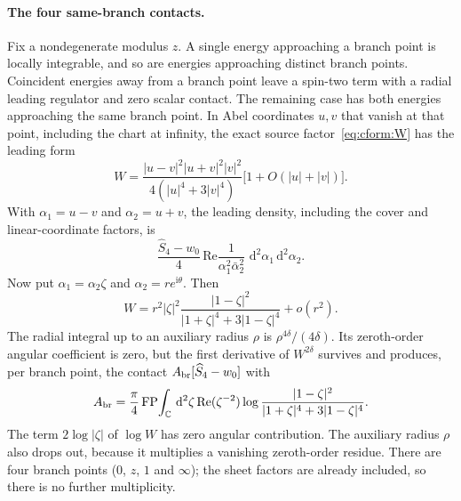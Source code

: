\documentclass[11pt,a4paper]{article}
\numberwithin{equation}{section}
\newcommand{\dd}{\,\mathrm d}
\newcommand{\FP}{\operatorname{FP}}
\begin{document}
\paragraph{The four same-branch contacts.} Fix a nondegenerate modulus $z$. A single energy approaching a branch point
is locally integrable, and so are energies approaching distinct branch points. Coincident energies away from a branch
point leave a spin-two term with a radial leading regulator and zero scalar contact. The remaining case has both
energies approaching the same branch point. In Abel coordinates $u,v$ that vanish at that point, including the chart
at infinity, the exact source factor~\eqref{eq:cform:W} has the leading form
\begin{equation}
 W=\frac{|u-v|^2|u+v|^2|v|^2}{4(|u|^4+3|v|^4)}\bigl[1+O(|u|+|v|)\bigr].
 \label{eq:cform:branchW}
\end{equation}
With $\alpha_1=u-v$ and $\alpha_2=u+v$, the leading density, including the cover and linear-coordinate factors, is
\begin{equation}
 \frac{\widehat S_4-w_0}{4}\,\mathrm{Re}\frac1{\alpha_1^2\bar\alpha_2^2}\,\dd^2\alpha_1\dd^2\alpha_2.
\end{equation}
Now put $\alpha_1=\alpha_2\zeta$ and $\alpha_2=re^{\mathrm i\theta}$. Then
\begin{equation}
 W=r^2|\zeta|^2\frac{|1-\zeta|^2}{|1+\zeta|^4+3|1-\zeta|^4}+o(r^2).
\end{equation}
The radial integral up to an auxiliary radius $\rho$ is $\rho^{4\delta}/(4\delta)$. Its zeroth-order angular
coefficient is zero, but the first derivative of $W^{2\delta}$ survives and produces, per branch point, the contact
$A_{\rm br}[\widehat S_4-w_0]$ with
\begin{equation}
 A_{\rm br}=\frac\pi4\FP\!\int_{\mathbb C}\dd^2\zeta\,\mathrm{Re}(\zeta^{-2})
 \log\frac{|1-\zeta|^2}{|1+\zeta|^4+3|1-\zeta|^4}.
 \label{eq:cform:Abr}
\end{equation}
The term $2\log|\zeta|$ of $\log W$ has zero angular contribution. The auxiliary radius $\rho$ also drops out,
because it multiplies a vanishing zeroth-order residue. There are four branch points ($0$, $z$, $1$ and $\infty$); the
sheet factors are already included, so there is no further multiplicity.
\end{document}
